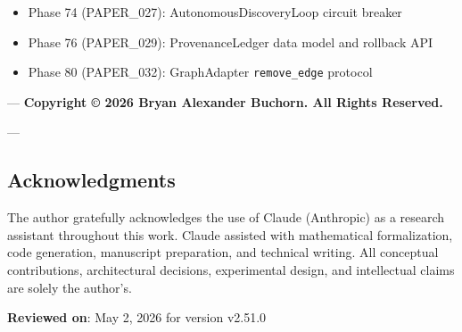 \begin{itemize}
\item Phase 74 (PAPER\_027): AutonomousDiscoveryLoop circuit breaker
\item Phase 76 (PAPER\_029): ProvenanceLedger data model and rollback API
\item Phase 80 (PAPER\_032): GraphAdapter \texttt{remove\_edge} protocol

\end{itemize}
---
\textbf{Copyright © 2026 Bryan Alexander Buchorn. All Rights Reserved.}

---
\subsection{Acknow\-ledgments}

The author gratefully ackno\-wledges the use of Claude (Anthropic) as a research assistant throughout this work. Claude assisted with mathe\-matical forma\-lization, code generation, manuscript preparation, and technical writing. All conceptual contr\-ibutions, archi\-tectural decisions, exper\-imental design, and intel\-lectual claims are solely the author's.

\textbf{Reviewed on}: May 2, 2026 for version v2.51.0
